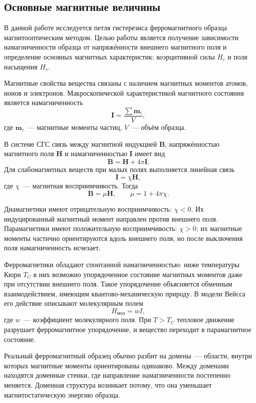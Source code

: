 \documentclass[a4paper,12pt]{article}
\begin{document}
\subsection*{Основные магнитные величины}

В данной работе исследуется петля гистерезиса ферромагнитного образца магнитооптическим методом. Целью работы является получение зависимости намагниченности образца от напряжённости внешнего магнитного поля и определение основных магнитных характеристик: коэрцитивной силы $H_c$ и поля насыщения $H_s$.

Магнитные свойства вещества связаны с наличием магнитных моментов атомов, ионов и электронов. Макроскопической характеристикой магнитного состояния является намагниченность
\[
    \mathbf I = \frac{\sum \mathbf m_i}{V},
\]
где $\mathbf m_i$~--- магнитные моменты частиц, $V$~--- объём образца.

В системе СГС связь между магнитной индукцией $\mathbf B$, напряжённостью магнитного поля $\mathbf H$ и намагниченностью $\mathbf I$ имеет вид
\[
    \mathbf B = \mathbf H + 4\pi \mathbf I.
\]
Для слабомагнитных веществ при малых полях выполняется линейная связь
\[
    \mathbf I = \chi \mathbf H,
\]
где $\chi$~--- магнитная восприимчивость. Тогда
\[
    \mathbf B = \mu \mathbf H, \qquad \mu = 1 + 4\pi\chi.
\]

Диамагнетики имеют отрицательную восприимчивость: $\chi < 0$. Их индуцированный магнитный момент направлен против внешнего поля. Парамагнетики имеют положительную восприимчивость: $\chi > 0$; их магнитные моменты частично ориентируются вдоль внешнего поля, но после выключения поля намагниченность исчезает.

Ферромагнетики обладают спонтанной намагниченностью: ниже температуры Кюри $T_C$ в них возможно упорядоченное состояние магнитных моментов даже при отсутствии внешнего поля. Такое упорядочение объясняется обменным взаимодействием, имеющим квантово-механическую природу. В модели Вейсса его действие описывают молекулярным полем
\[
    H_{\text{мол}} = w I,
\]
где $w$~--- коэффициент молекулярного поля. При $T > T_C$ тепловое движение разрушает ферромагнитное упорядочение, и вещество переходит в парамагнитное состояние.

Реальный ферромагнитный образец обычно разбит на домены~--- области, внутри которых магнитные моменты ориентированы одинаково. Между доменами находятся доменные стенки, где направление намагниченности постепенно меняется. Доменная структура возникает потому, что она уменьшает магнитостатическую энергию образца.
\end{document}
